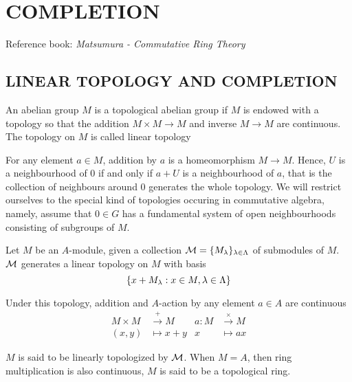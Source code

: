 \chapter{COMPLETION}

Reference book: \textit{Matsumura - Commutative Ring Theory}

\section{LINEAR TOPOLOGY AND COMPLETION}


\begin{definition}
	An abelian group $M$ is a topological abelian group if $M$ is endowed with a topology so that the addition $M \times M \to M$ and inverse $M \to M$ are continuous. The topology on $M$ is called linear topology
\end{definition}

\begin{remark}
	For any element $a \in M$, addition by $a$ is a homeomorphism $M \to M$. Hence, $U$ is a neighbourhood of $0$ if and only if $a + U$ is a neighbourhood of $a$, that is the collection of neighbours around $0$ generates the whole topology. We will restrict ourselves to the special kind of topologies occuring in commutative algebra, namely, assume that $0 \in G$ has a fundamental system of open neighbourhoods consisting of subgroups of $M$.
\end{remark}

\begin{definition}
	Let $M$ be an $A$-module, given a collection $\mathcal{M} = \{M_\lambda\}_{\lambda \in \Lambda}$ of submodules of $M$. $\mathcal{M}$ generates a linear topology on $M$ with basis
	$$
		\{x + M_\lambda: x \in M, \lambda \in \Lambda\}
	$$
	
	Under this topology, addition and $A$-action by any element $a \in A$ are continuous
	\begin{align*}
		M \times M &\xrightarrow{+} M		&a: M &\xrightarrow{\times} M \\
		(x, y) &\mapsto x + y						 &x &\mapsto ax
	\end{align*}
	
	$M$ is said to be linearly topologized by $\mathcal{M}$. When $M = A$, then ring multiplication is also continuous, $M$ is said to be a topological ring.
\end{definition}


